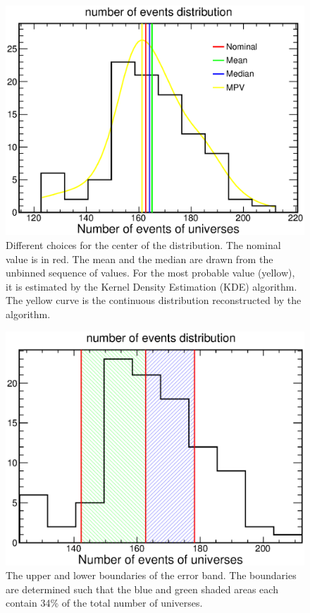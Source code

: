 \documentclass[12pt,a4paper,final]{iopart}
\begin{document}
\begin{figure}[h]
  \centering
  \includegraphics[width=.75\textwidth]{figures/spread_from_different_points.eps}
  \caption{Different choices for the center of the distribution. The nominal value is in red. The mean and the median are drawn from the unbinned sequence of values. For the most probable value (yellow), it is estimated by the Kernel Density Estimation (KDE) algorithm. The yellow curve is the continuous distribution reconstructed by the algorithm.}
  \label{fig:spread}
\end{figure}

\begin{figure}[h]
  \centering
  \includegraphics[width=.75\textwidth]{figures/band_boundaries.eps}
  \caption{The upper and lower boundaries of the error band. The boundaries are determined such that the blue and green shaded areas each contain 34\% of the total number of universes.}
  \label{fig:boundaries}
\end{figure}
\end{document}
